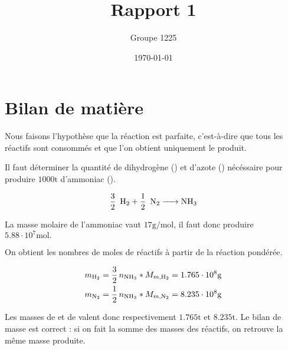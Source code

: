 \documentclass[a4paper, oneside, 12pt]{article}
\title{Rapport 1}
\author{Groupe 1225}
\date{\today}
\begin{document}
\maketitle

\section{Bilan de matière}

Nous faisons l'hypothèse que la réaction est parfaite, 
c'est-à-dire que tous les réactifs sont consommés 
et que l'on obtient uniquement le produit.

Il faut déterminer la quantité de dihydrogène () et d'azote () 
nécéssaire pour produire $1000 \si{\tonne}$ d'ammoniac ().

\begin{equation}
	\ce{\frac{3}{2} \, H2 + \frac{1}{2} \, N2 -> NH3} 
	\label{eq:ammoniac}
\end{equation}

La masse molaire de l'ammoniac vaut $17 \si{\gram\per\mole}$,
il faut donc produire $5.88 \cdot 10^7 \si{\mole}.$

On obtient les nombres de moles de réactifs à partir de la réaction pondérée. 

\begin{align*}
	m_{\ce{H2}}  =\frac{3}{2} \, n_{\ce{NH3}} * M_{m, \ce{H2}} = 1.765 \cdot 10^8  \si{\gram} \\
	m_{\ce{N2}} = \frac{1}{2} \, n_{\ce{NH3}} * M_{m, \ce{N2}} = 8.235 \cdot 10^8 \si{\gram}
\end{align*}

Les masses de  et de  valent donc 
respectivement $1.765 \si{\tonne}$ et $8.235 \si{\tonne}$.
Le bilan de masse est correct : si on fait la somme des masses des réactifs,
on retrouve la même masse produite.
\end{document}
